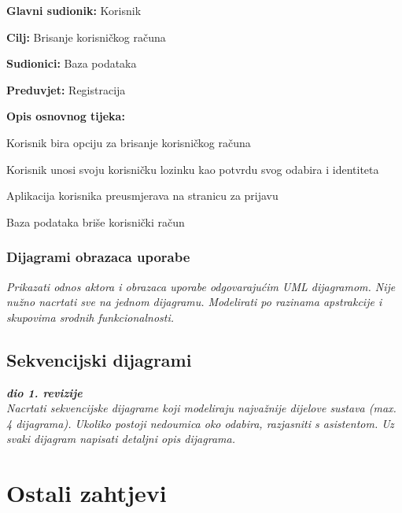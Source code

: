 			\noindent {}
			\begin{packed_item}
				
				\item \textbf{Glavni sudionik: } Korisnik
				\item  \textbf{Cilj:} Brisanje korisničkog računa
				\item  \textbf{Sudionici:} Baza podataka
				\item  \textbf{Preduvjet:} Registracija
				\item  \textbf{Opis osnovnog tijeka:}
				
				\item[] \begin{packed_enum}
					
					\item Korisnik bira opciju za brisanje korisničkog računa
					\item Korisnik unosi svoju korisničku lozinku kao potvrdu svog odabira i identiteta
					\item Aplikacija korisnika preusmjerava na stranicu za prijavu
					\item Baza podataka briše korisnički račun
				\end{packed_enum}
			\end{packed_item}
				
					
				\subsubsection{Dijagrami obrazaca uporabe}
					
					\textit{Prikazati odnos aktora i obrazaca uporabe odgovarajućim UML dijagramom. Nije nužno nacrtati sve na jednom dijagramu. Modelirati po razinama apstrakcije i skupovima srodnih funkcionalnosti.}
				\eject		
				
			\subsection{Sekvencijski dijagrami}
				
				\textbf{\textit{dio 1. revizije}}\\
				
				\textit{Nacrtati sekvencijske dijagrame koji modeliraju najvažnije dijelove sustava (max. 4 dijagrama). Ukoliko postoji nedoumica oko odabira, razjasniti s asistentom. Uz svaki dijagram napisati detaljni opis dijagrama.}
				\eject
	
		\section{Ostali zahtjevi}
		
